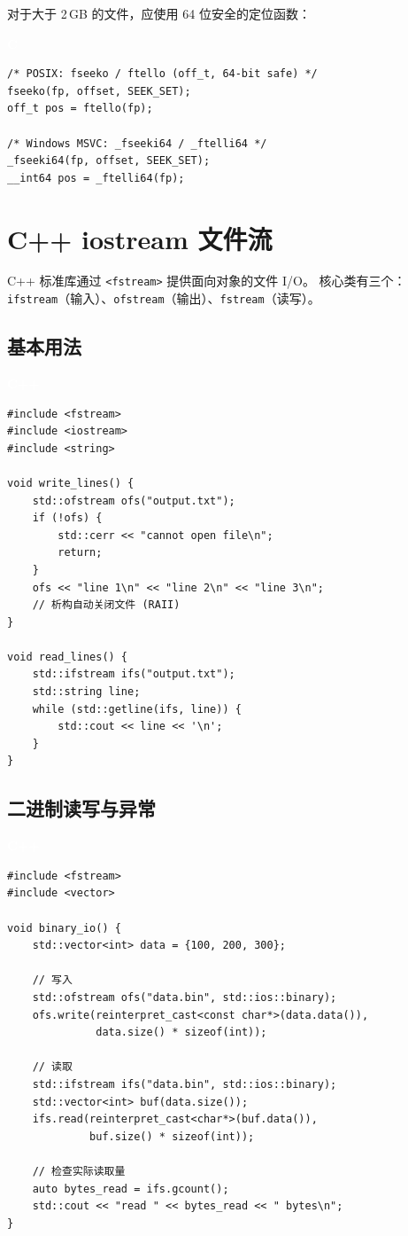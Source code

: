 \documentclass[12pt,a4paper,fontset=fandol]{ctexbook}
\newcommand{\Tp}[1]{\texttt{#1}}
\newcommand{\clabel}{%
  \noindent\begin{tcolorbox}[sharp corners,colback=fileheadbg,colframe=fileheadbg,
    left=6pt,right=6pt,top=2pt,bottom=2pt,boxrule=0pt]
  \textcolor{white}{\small\bfseries\sffamily C}\end{tcolorbox}%
}
\newcommand{\cpplabel}{%
  \noindent\begin{tcolorbox}[sharp corners,colback=algheadbg,colframe=algheadbg,
    left=6pt,right=6pt,top=2pt,bottom=2pt,boxrule=0pt]
  \textcolor{white}{\small\bfseries\sffamily C++}\end{tcolorbox}%
}
\begin{document}
对于大于 2\,GB 的文件，应使用 64 位安全的定位函数：

\clabel
\begin{lstlisting}[style=cstyle]
/* POSIX: fseeko / ftello (off_t, 64-bit safe) */
fseeko(fp, offset, SEEK_SET);
off_t pos = ftello(fp);

/* Windows MSVC: _fseeki64 / _ftelli64 */
_fseeki64(fp, offset, SEEK_SET);
__int64 pos = _ftelli64(fp);
\end{lstlisting}

\section{C++ iostream 文件流}

C++ 标准库通过 \Tp{<fstream>} 提供面向对象的文件 I/O。
核心类有三个：\Tp{ifstream}（输入）、\Tp{ofstream}（输出）、\Tp{fstream}（读写）。

\subsection{基本用法}

\cpplabel
\begin{lstlisting}
#include <fstream>
#include <iostream>
#include <string>

void write_lines() {
    std::ofstream ofs("output.txt");
    if (!ofs) {
        std::cerr << "cannot open file\n";
        return;
    }
    ofs << "line 1\n" << "line 2\n" << "line 3\n";
    // 析构自动关闭文件 (RAII)
}

void read_lines() {
    std::ifstream ifs("output.txt");
    std::string line;
    while (std::getline(ifs, line)) {
        std::cout << line << '\n';
    }
}
\end{lstlisting}

\subsection{二进制读写与异常}

\cpplabel
\begin{lstlisting}
#include <fstream>
#include <vector>

void binary_io() {
    std::vector<int> data = {100, 200, 300};

    // 写入
    std::ofstream ofs("data.bin", std::ios::binary);
    ofs.write(reinterpret_cast<const char*>(data.data()),
              data.size() * sizeof(int));

    // 读取
    std::ifstream ifs("data.bin", std::ios::binary);
    std::vector<int> buf(data.size());
    ifs.read(reinterpret_cast<char*>(buf.data()),
             buf.size() * sizeof(int));

    // 检查实际读取量
    auto bytes_read = ifs.gcount();
    std::cout << "read " << bytes_read << " bytes\n";
}
\end{lstlisting}
\end{document}
